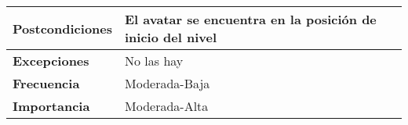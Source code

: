 \begin{tabularx}{\columnwidth}{l|l}
\begin{minipage}{0.25\columnwidth}
\textbf{Postcondiciones} 
\end{minipage}
&
\begin{minipage}{0.65\columnwidth}
El avatar se encuentra en la posición de inicio del nivel
\end{minipage}
\\ \hline

\begin{minipage}{0.25\columnwidth}
\textbf{Excepciones} 
\end{minipage}
&
\begin{minipage}{0.65\columnwidth}
No las hay 
\end{minipage}
\\ \hline

\begin{minipage}{0.25\columnwidth}
\textbf{Frecuencia} 
\end{minipage}
&
\begin{minipage}{0.65\columnwidth}
Moderada-Baja
\end{minipage}
\\ \hline

\begin{minipage}{0.25\columnwidth}
\textbf{Importancia} 
\end{minipage}
&
\begin{minipage}{0.65\columnwidth}
Moderada-Alta
\end{minipage}
\\ \hline
\end{tabularx}

